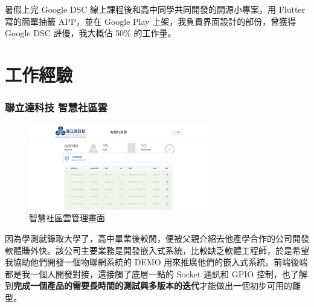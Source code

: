 \documentclass[classical]{einfart}
\begin{document}
暑假上完 Google DSC 線上課程後和高中同學共同開發的開源小專案，用 Flutter
寫的簡單抽籤 APP，並在 Google Play 上架，我負責界面設計的部份，曾獲得
Google DSC 評優，我大概佔 50\% 的工作量。

\part{工作經驗}

\section{聯立達科技 智慧社區雲}

\begin{figure}[H]
    \centering
    \includegraphics[width=0.7\textwidth]{images/iot_cloud.png}
    \caption{智慧社區雲管理畫面}
\end{figure}

因為學測就錄取大學了，高中畢業後較閒，便被父親介紹去他產學合作的公司開發軟體賺外快。該公司主要業務是開發嵌入式系統，比較缺乏軟體工程師，於是希望我協助他們開發一個物聯網系統的
DEMO
用來推廣他們的嵌入式系統。前端後端都是我一個人開發對接，還接觸了底層一點的
Socket 通訊和 GPIO
控制，也了解到\textbf{完成一個產品的需要長時間的測試與多版本的迭代}才能做出一個初步可用的雛型。
\end{document}
